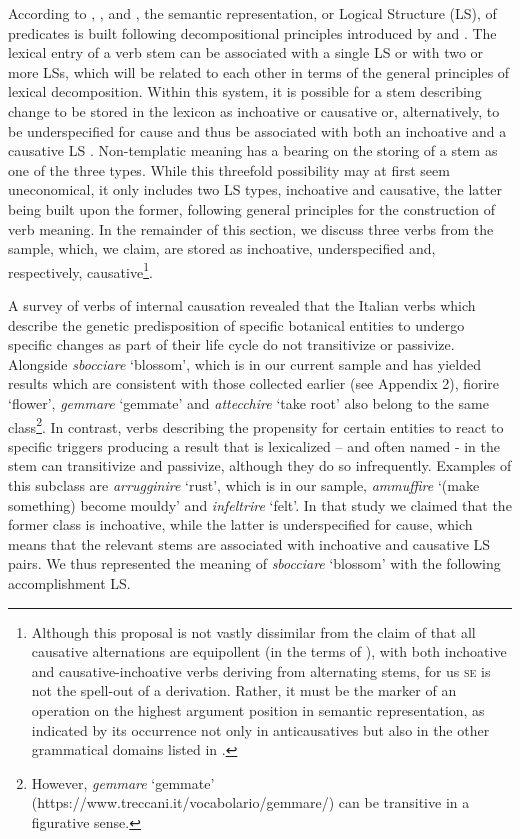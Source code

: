 \documentclass[output=paper,colorlinks,citecolor=brown
]{langscibook}
\begin{document}
According to \citet[82--129]{vanvalin1997syntax}, \citet[32--49]{vanvalin2005exploring}, and \citet[94--107]{vanvalin2023principles}, the semantic representation, or Logical Structure (LS), of predicates is built following decompositional principles introduced by \citet{vendler1967linguistics} and \citet{dowty1979word}. The lexical entry of a verb stem can be associated with a single LS or with two or more LSs, which will be related to each other in terms of the general principles of lexical decomposition. Within this system, it is possible for a stem describing change to be stored in the lexicon as inchoative or causative or, alternatively, to be underspecified for cause and thus be associated with both an inchoative and a causative LS \citep{brocher2017full}. Non-templatic meaning has a bearing on the storing of a stem as one of the three types. While this threefold possibility may at first seem uneconomical, it only includes two LS types, inchoative and causative, the latter being built upon the former, following general principles for the construction of verb meaning. In the remainder of this section, we discuss three verbs from the sample, which, we claim, are stored as inchoative, underspecified and, respectively, causative\footnote{Although this proposal is not vastly dissimilar from the claim of \citet{pinon2001finer} that all causative alternations are equipollent (in the terms of \cite{haspelmath1993more}), with both inchoative and causative-inchoative verbs deriving from alternating stems, for us \textsc{se} is not the spell-out of a derivation. Rather, it must be the marker of an operation on the highest argument position in semantic representation, as indicated by its occurrence not only in anticausatives but also in the other grammatical domains listed in .}. 

A survey of verbs of internal causation \citep{bentley2023internally} revealed that the Italian verbs which describe the genetic predisposition of specific botanical entities to undergo specific changes as part of their life cycle do not transitivize or passivize. Alongside \textit{sbocciare} ‘blossom’, which is in our current sample and has yielded results which are consistent with those collected earlier (see Appendix 2), fiorire ‘flower’, \textit{gemmare} ‘gemmate’ and \textit{attecchire} ‘take root’ also belong to the same class\footnote{However, \textit{gemmare} ‘gemmate’ (https://www.treccani.it/vocabolario/gemmare/) can be transitive in a figurative sense.}.   In contrast, verbs describing the propensity for certain entities to react to specific triggers producing a result that is lexicalized – and often named - in the stem can transitivize and passivize, although they do so infrequently. Examples of this subclass are \textit{arrugginire} ‘rust’, which is in our sample, \textit{ammuffire} ‘(make something) become mouldy’ and \textit{infeltrire} ‘felt’. In that study we claimed that the former class is inchoative, while the latter is underspecified for cause, which means that the relevant stems are associated with inchoative and causative LS pairs. We thus represented the meaning of \textit{sbocciare} ‘blossom’ with the following accomplishment LS. 
\end{document}
